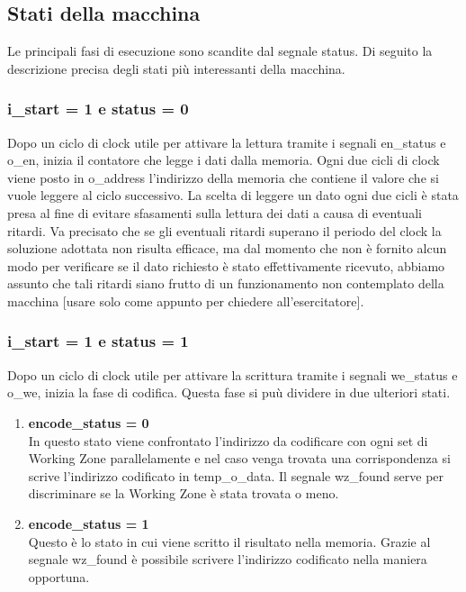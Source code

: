 \documentclass{article}
\begin{document}
\subsection{Stati della macchina}
Le principali fasi di esecuzione sono scandite dal segnale {\selectfont status}. Di seguito la descrizione precisa degli stati più interessanti della macchina.
\subsubsection{{\selectfont i\_start} = 1 e {\selectfont status} = 0}
Dopo un ciclo di clock utile per attivare la lettura tramite i segnali {\selectfont en\_status} e {\selectfont o\_en}, inizia il contatore che legge i dati dalla memoria. Ogni due cicli di clock viene posto in {\selectfont o\_address} l'indirizzo della memoria che contiene il valore che si vuole leggere al ciclo successivo. La scelta di leggere un dato ogni due cicli è stata presa al fine di evitare sfasamenti sulla lettura dei dati a causa di eventuali ritardi. Va precisato che se gli eventuali ritardi superano il periodo del clock la soluzione adottata non risulta efficace, ma dal momento che non è fornito alcun modo per verificare se il dato richiesto è stato effettivamente ricevuto, abbiamo assunto che tali ritardi siano frutto di un funzionamento non contemplato della macchina [usare solo come appunto per chiedere all'esercitatore].
\subsubsection{{\selectfont i\_start} = 1 e {\selectfont status} = 1}
Dopo un ciclo di clock utile per attivare la scrittura tramite i segnali {\selectfont we\_status} e {\selectfont o\_we}, inizia la fase di codifica. Questa fase si puù dividere in due ulteriori stati.
\begin{enumerate}
\item\textbf{{\selectfont encode\_status} = 0}\\
In questo stato viene confrontato l'indirizzo da codificare con ogni set di Working Zone parallelamente e nel caso venga trovata una corrispondenza si scrive l'indirizzo codificato in {\selectfont temp\_o\_data}. Il segnale {\selectfont wz\_found} serve per discriminare se la Working Zone è stata trovata o meno.
\item\textbf{{\selectfont encode\_status} = 1}\\
Questo è lo stato in cui viene scritto il risultato nella memoria. Grazie al segnale {\selectfont wz\_found} è possibile scrivere l'indirizzo codificato nella maniera opportuna.
\end{enumerate}
\end{document}
